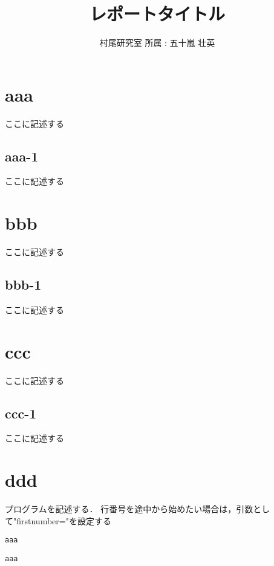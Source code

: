 \documentclass[a4paper]{jarticle}
\title{レポートタイトル}
\author{村尾研究室 所属 : 五十嵐 壮英}
\date{\todayAD}
\begin{document}
\maketitle
\section{aaa}
\label{aaa}
ここに記述する
\vspace{2.5mm}
%
\subsection{aaa-1}
\label{aaa-1}
ここに記述する
\vspace{7.5mm}
\section{bbb}
\label{bbb}
ここに記述する
\vspace{2.5mm}
%
\subsection{bbb-1}
\label{bbb-1}
ここに記述する
\vspace{7.5mm}
\section{ccc}
\label{ccc}
ここに記述する
\vspace{2.5mm}
%
\subsection{ccc-1}
\label{ccc-1}
ここに記述する
\vspace{7.5mm}
\section{ddd}
\label{ddd}
プログラムを記述する．
行番号を途中から始めたい場合は，引数として"firstnumber="を設定する
%
\begin{lstlisting}[caption={firstnumber=101の場合}, firstnumber=101]
aaa
\end{lstlisting}
%
\begin{lstlisting}[caption={firstnumber=50の場合}, firstnumber=50]
aaa
\end{lstlisting}
% 
\end{document}
